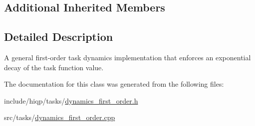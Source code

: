 \subsection*{Additional Inherited Members}


\subsection{Detailed Description}
A general first-\/order task dynamics implementation that enforces an exponential decay of the task function value. 

The documentation for this class was generated from the following files\-:\begin{DoxyCompactItemize}
\item 
include/hiqp/tasks/\hyperlink{dynamics__first__order_8h}{dynamics\-\_\-first\-\_\-order.\-h}\item 
src/tasks/\hyperlink{dynamics__first__order_8cpp}{dynamics\-\_\-first\-\_\-order.\-cpp}\end{DoxyCompactItemize}
